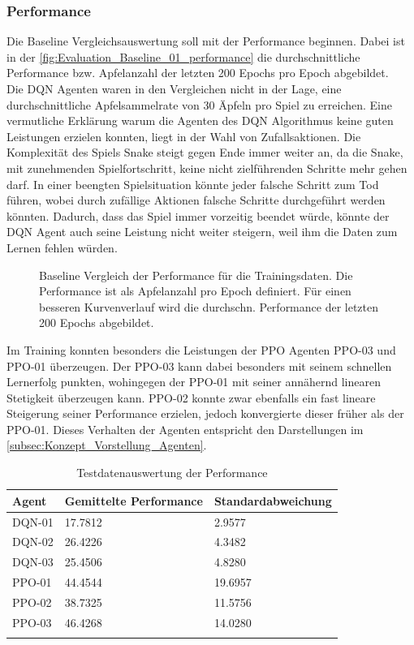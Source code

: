 \subsubsection{Performance}
Die Baseline Vergleichsauswertung soll mit der Performance beginnen. Dabei ist in der \autoref{fig:Evaluation_Baseline_01_performance} die durchschnittliche Performance bzw. Apfelanzahl der letzten 200 Epochs pro Epoch abgebildet.\\
Die DQN Agenten waren in den Vergleichen nicht in der Lage, eine durchschnittliche Apfelsammelrate von 30 Äpfeln pro Spiel zu erreichen. 
Eine vermutliche Erklärung warum die Agenten des DQN Algorithmus keine guten Leistungen erzielen konnten, liegt in der Wahl von Zufallsaktionen. Die Komplexität des Spiels Snake steigt gegen Ende immer weiter an, da die Snake, mit zunehmenden Spielfortschritt, keine nicht zielführenden Schritte mehr gehen darf. In einer beengten Spielsituation könnte jeder falsche Schritt zum Tod führen, wobei durch zufällige Aktionen falsche Schritte durchgeführt werden könnten. Dadurch, dass das Spiel immer vorzeitig beendet würde, könnte der DQN Agent auch seine Leistung nicht weiter steigern, weil ihm die Daten zum Lernen fehlen würden.
\begin{figure}[H]
	\centering
	
	\caption[Baseline Vergleich Performance]{Baseline Vergleich der Performance für die Trainingsdaten. Die Performance ist als Apfelanzahl pro Epoch definiert. Für einen besseren Kurvenverlauf wird die durchschn. Performance der letzten 200 Epochs abgebildet.}
	\label{fig:Evaluation_Baseline_01_performance}
\end{figure}
Im Training konnten besonders die Leistungen der PPO Agenten PPO-03 und PPO-01 überzeugen. 
Der PPO-03 kann dabei besonders mit seinem schnellen Lernerfolg punkten, wohingegen der PPO-01 mit seiner annähernd linearen Stetigkeit überzeugen kann.
PPO-02 konnte zwar ebenfalls ein fast lineare Steigerung seiner Performance erzielen, jedoch konvergierte dieser früher als der PPO-01.
Dieses Verhalten der Agenten entspricht den Darstellungen im \autoref{subsec:Konzept_Vorstellung_Agenten}.
\begin{longtable}[h]{|p{2.7cm}|p{4.5cm}|p{4cm}|}
	\hline
	Agent & Gemittelte Performance & Standardabweichung \\
	\hline
	DQN-01 & 17.7812 & 2.9577 \\
	\hline
	DQN-02 & 26.4226 & 4.3482 \\
	\hline
	DQN-03 & 25.4506 & 4.8280 \\
	\hline
	PPO-01 & 44.4544 & 19.6957 \\
	\hline
	PPO-02 & 38.7325 & 11.5756 \\
	\hline
	PPO-03 & 46.4268 & 14.0280 \\
	\hline
\caption{Testdatenauswertung der Performance}
\label{tab:Evaluation_Testdaten_Performance} 
\end{longtable}
